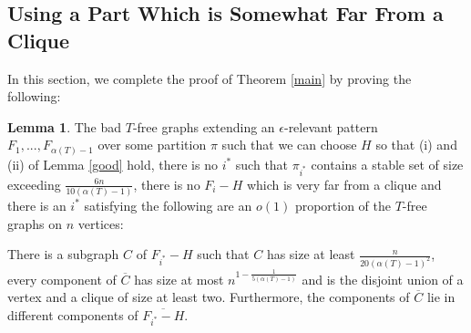 \documentclass[12pt]{article}
\theoremstyle{definition}
\newtheorem{lemma}[theorem]{Lemma}
\begin{document}
 
\subsection{Using a Part Which is Somewhat Far From a Clique}


 
 In this section,  we  complete the proof of Theorem \ref{main} by proving the following: 


\begin{lemma}\label{nobigstable}
The  bad $T$-free  graphs extending an $\epsilon$-relevant pattern $F_1,...,F_{\alpha(T)-1}$  over some partition $\pi$ such that we can choose $H$ so that  (i) and (ii) of Lemma \ref{good} hold,  there is no   $i^*$    such that $\pi_{i^*}$  contains  a stable set of size exceeding $ \frac{6n}{10(\alpha(T)-1)}$, there is no $F_i-H$ which is very far from a clique  
 and  there is an  $i^*$ satisfying the following are   an $o(1)$ proportion of the $T$-free graphs on $n$ vertices:
 
There is a subgraph $C$  of $F_{i^*}-H$  such that   $C$ has size at least $\frac{n}{20(\alpha(T)-1)^2}$, 
every  component of $\overline{C}$ has size  at most  $n^{1-\frac{1}{5(\alpha(T)-1)}}$  and is the disjoint union of a vertex and a clique of size at least two.
Furthermore, the components of $\overline{C}$ lie in different components of $\overline{F_{i^*}-H}$.
 \end{lemma}
\end{document}

